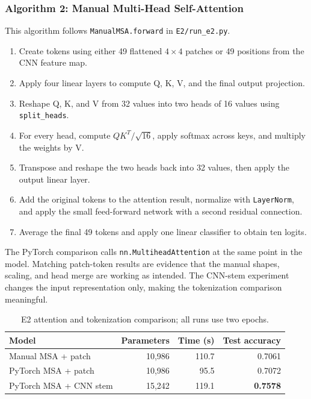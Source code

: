 \documentclass[oneside]{hcmut-report}
\begin{document}
\subsubsection{Algorithm 2: Manual Multi-Head Self-Attention}
This algorithm follows \texttt{ManualMSA.forward} in \texttt{E2/run\_e2.py}.
\begin{enumerate}[leftmargin=8mm]
  \item Create tokens using either 49 flattened $4\times4$ patches or 49 positions from the CNN feature map.
  \item Apply four linear layers to compute Q, K, V, and the final output projection.
  \item Reshape Q, K, and V from 32 values into two heads of 16 values using \texttt{split\_heads}.
  \item For every head, compute $QK^T/\sqrt{16}$, apply softmax across keys, and multiply the weights by V.
  \item Transpose and reshape the two heads back into 32 values, then apply the output linear layer.
  \item Add the original tokens to the attention result, normalize with \texttt{LayerNorm}, and apply the small feed-forward network with a second residual connection.
  \item Average the final 49 tokens and apply one linear classifier to obtain ten logits.
\end{enumerate}
The PyTorch comparison calls \texttt{nn.MultiheadAttention} at the same point in the model. Matching patch-token results are evidence that the manual shapes, scaling, and head merge are working as intended. The CNN-stem experiment changes the input representation only, making the tokenization comparison meaningful.

\begin{table}[H]\centering
\caption{E2 attention and tokenization comparison; all runs use two epochs.}\label{tab:e2-results}
\begin{tabular}{lrrr}\toprule
\textbf{Model} & \textbf{Parameters} & \textbf{Time (s)} & \textbf{Test accuracy} \\\midrule
Manual MSA + patch & 10,986 & 110.7 & 0.7061 \\
PyTorch MSA + patch & 10,986 & 95.5 & 0.7072 \\
PyTorch MSA + CNN stem & 15,242 & 119.1 & \textbf{0.7578} \\\bottomrule
\end{tabular}\end{table}
\end{document}
